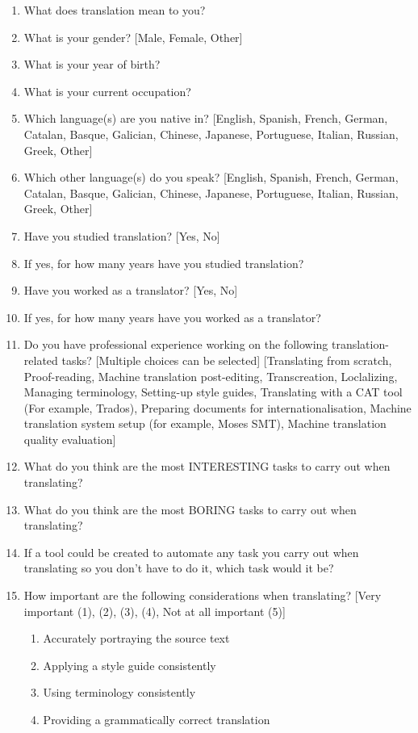 \begin{enumerate}
\item What does translation mean to you? 
\item What is your gender? [Male, Female, Other]
\item What is your year of birth? 
\item What is your current occupation?
\item Which language(s) are you native in? [English, Spanish, French, German, Catalan, Basque, Galician, Chinese, Japanese, Portuguese, Italian, Russian, Greek, Other]
\item Which other language(s) do you speak? [English, Spanish, French, German, Catalan, Basque, Galician, Chinese, Japanese, Portuguese, Italian, Russian, Greek, Other]
\item Have you studied translation? [Yes, No]
\item If yes, for how many years have you studied translation?
\item Have you worked as a translator? [Yes, No]
\item If yes, for how many years have you worked as a translator?
\item Do you have professional experience working on the following translation-related tasks? [Multiple choices can be selected] [Translating from scratch, Proof-reading, Machine translation post-editing, Transcreation, Loclalizing, Managing terminology, Setting-up style guides, Translating with a CAT tool (For example, Trados), Preparing documents for internationalisation, Machine translation system setup (for example, Moses SMT), Machine translation quality evaluation]
\item What do you think are the most INTERESTING tasks to carry out when translating?
\item What do you think are the most BORING tasks to carry out when translating?
\item If a tool could be created to automate any task you carry out when translating so you don't have to do it, which task would it be?
\item How important are the following considerations when translating? [Very important (1), (2), (3), (4), Not at all important (5)]
\begin{enumerate}
\item Accurately portraying the source text
\item Applying a style guide consistently
\item Using terminology consistently
\item Providing a grammatically correct translation

\end{enumerate}
\end{enumerate}
